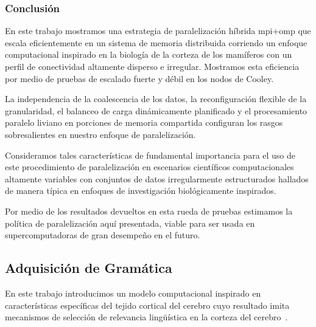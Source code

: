 \subsubsection{Conclusión}

En este trabajo mostramos una estrategia de paralelización híbrida \gls{mpi}+\gls{omp} que escala eficientemente en un sistema de memoria distribuida corriendo un enfoque computacional inspirado en la biología de la corteza de los mamíferos con un perfil de conectividad altamente disperso e irregular.
Mostramos esta eficiencia por medio de pruebas de escalado fuerte y débil en los nodos de Cooley.

La independencia de la coalescencia de los datos, la reconfiguración flexible de la granularidad, el balanceo de carga dinámicamente planificado y el procesamiento paralelo liviano en porciones de memoria compartida configuran los rasgos sobresalientes en nuestro enfoque de paralelización.

Consideramos tales características de fundamental importancia para el uso de este procedimiento de paralelización en escenarios científicos computacionales altamente variables con conjuntos de datos irregularmente estructurados hallados de manera típica en enfoques de investigación biológicamente inspirados.

Por medio de los resultados devueltos en esta rueda de pruebas estimamos la política de paralelización aquí presentada, viable para ser usada en supercomputadoras de gran desempeño en el futuro.
















\subsection{Adquisición de Gramática}

En este trabajo introducimos un modelo computacional inspirado en características específicas del tejido cortical del cerebro cuyo resultado imita mecanismos de selección de relevancia lingüística en la corteza del cerebro~\cite{Gibson1998-GIBCOS, Hagoort2005OnBB, Rego1993TheCB, 10.1371/journal.pone.0177794}.

